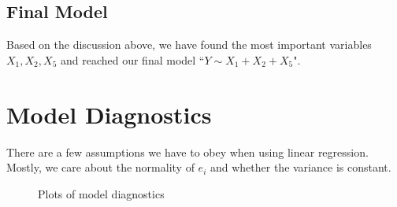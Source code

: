 \documentclass[a4paper,11pt,onecolumn,twoside]{article}
\begin{document}
\subsection{Final Model}
Based on the discussion above, we have found the most important variables $X_1,X_2,X_5$ and reached our final model ``$Y\sim X_1+X_2+X_5$".

\section{Model Diagnostics}
There are a few assumptions we have to obey when using linear regression. Mostly, we care about the normality of $e_i$ and whether the variance is constant.
\begin{figure}[htbp]
	\centering
	\caption{Plots of model diagnostics}
\end{figure}
\end{document}

